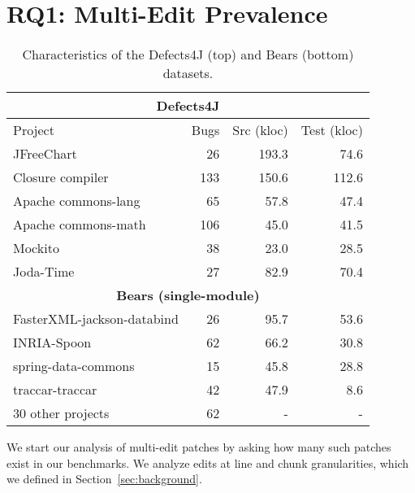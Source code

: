 \documentclass[sigconf, timestamp-false, anonymous=true]{acmart}
\begin{document}
\section{RQ1: Multi-Edit Prevalence}
\label{sec:data-rq1}

\begin{table}
\begin{center}
\begin{tabular}{l | rrr}
\toprule
\multicolumn{4}{c}{\textbf{Defects4J}} \\
\midrule
Project & Bugs & Src (kloc) & Test (kloc) \\
\midrule
JFreeChart  & 26 & 193.3 & 74.6 \\
Closure compiler & 133 & 150.6 & 112.6 \\
Apache commons-lang & 65 & 57.8 & 47.4 \\
Apache commons-math & 106 & 45.0 & 41.5 \\
Mockito & 38 & 23.0 & 28.5 \\
Joda-Time & 27 & 82.9 & 70.4 \\
\midrule
\multicolumn{4}{c}{\textbf{Bears (single-module)}} \\
\midrule
FasterXML-jackson-databind & 26 & 95.7 & 53.6 \\
INRIA-Spoon & 62 & 66.2 & 30.8 \\
spring-data-commons & 15 & 45.8 & 28.8 \\
traccar-traccar & 42 & 47.9 & 8.6 \\
30 other projects & 62 & - & -\\
\bottomrule
\end{tabular}
\end{center}
\caption{\label{tab:data} Characteristics of the Defects4J (top) and Bears (bottom) datasets.}
\end{table}


We start our analysis of multi-edit patches by asking how many such patches 
exist in our benchmarks. We analyze edits at line and chunk granularities,
which we defined in Section~\ref{sec:background}.
\end{document}
